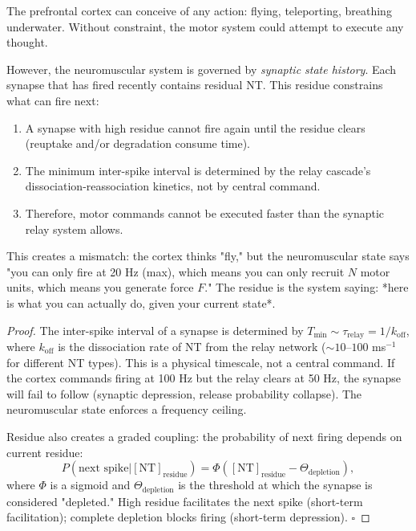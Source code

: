 \begin{theorem}
\label{thm:residue-prevention}
The prefrontal cortex can conceive of any action: flying, teleporting, breathing underwater. Without constraint, the motor system could attempt to execute any thought.

However, the neuromuscular system is governed by \emph{synaptic state history}. Each synapse that has fired recently contains residual NT. This residue constrains what can fire next:

\begin{enumerate}[label=(\roman*), noitemsep]
\item A synapse with high residue cannot fire again until the residue clears (reuptake and/or degradation consume time).
\item The minimum inter-spike interval is determined by the relay cascade's dissociation-reassociation kinetics, not by central command.
\item Therefore, motor commands cannot be executed faster than the synaptic relay system allows.
\end{enumerate}

This creates a mismatch: the cortex thinks "fly," but the neuromuscular state says "you can only fire at 20 Hz (max), which means you can only recruit $N$ motor units, which means you generate force $F$." The residue is the system saying: *here is what you can actually do, given your current state*.
\end{theorem}

\begin{proof}
The inter-spike interval of a synapse is determined by $T_{\text{min}} \sim \tau_{\text{relay}} = 1/k_{\text{off}}$, where $k_{\text{off}}$ is the dissociation rate of NT from the relay network ($\sim 10$--$100$ ms$^{-1}$ for different NT types). This is a physical timescale, not a central command. If the cortex commands firing at 100 Hz but the relay clears at 50 Hz, the synapse will fail to follow (synaptic depression, release probability collapse). The neuromuscular state enforces a frequency ceiling.

Residue also creates a graded coupling: the probability of next firing depends on current residue:
\begin{equation}
  P(\text{next spike}|[\text{NT}]_{\text{residue}}) = \Phi([\text{NT}]_{\text{residue}} - \Theta_{\text{depletion}}),
\end{equation}
where $\Phi$ is a sigmoid and $\Theta_{\text{depletion}}$ is the threshold at which the synapse is considered "depleted." High residue facilitates the next spike (short-term facilitation); complete depletion blocks firing (short-term depression). $\square$
\end{proof}

